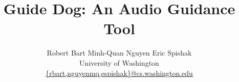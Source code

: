 \documentclass{acm_proc_article-sp}
\begin{document}


\newcommand{\includeimage}[3]{
\begin{center}
\resizebox{!}{#2}{\texttt{[image: images/\#1]}}
\vspace{-1.5\baselineskip}
\end{center}}

\title{Guide Dog: An Audio Guidance Tool}

%
%
%
%
%

%
%
%

\author{
Robert Bart
\qquad
Minh-Quan Nguyen
\qquad
Eric Spishak\\
%
{\normalsize
University of Washington}\\
\url{{rbart,nguyenmq,espishak}@cs.washington.edu}
}
\end{document}
